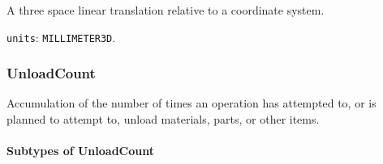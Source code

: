 A three space linear translation relative to a coordinate system.



\texttt{units}: \texttt{MILLIMETER\textunderscore 3D}.


\subsubsection{UnloadCount}
\label{sec:UnloadCount}



Accumulation of the number of times an operation has attempted to, or is planned to attempt to, unload materials, parts, or other items.


\paragraph{Subtypes of UnloadCount}\mbox{}
\label{sec:Subtypes of UnloadCount}


